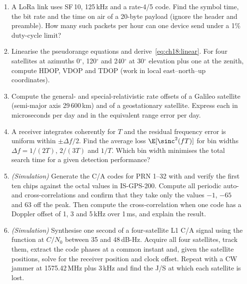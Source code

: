 \begin{enumerate}[label=\thechapter.\arabic*]
Cauchy--Schwarz) and derive~\eqref{eq:ch18:mrc}. For two paths of mean SNR 10\,dB each, compute
the probability that the combined SNR falls below 3\,dB, and compare with a single path of mean
SNR 13\,dB.
\item A LoRa link uses SF\,10, 125\,kHz and a rate-4/5 code. Find the symbol time, the bit rate
and the time on air of a 20-byte payload (ignore the header and preamble). How many such
packets per hour can one device send under a 1\% duty-cycle limit?
\item Linearise the pseudorange equations and derive~\eqref{eq:ch18:linear}. For four satellites
at azimuths 0$^\circ$, 120$^\circ$ and 240$^\circ$ at 30$^\circ$ elevation plus one at the
zenith, compute HDOP, VDOP and TDOP (work in local east--north--up coordinates).
\item Compute the general- and special-relativistic rate offsets of a Galileo satellite
(semi-major axis 29\,600\,km) and of a geostationary satellite. Express each in microseconds per
day and in the equivalent range error per day.
\item A receiver integrates coherently for $T$ and the residual frequency error is uniform within
$\pm\Delta f/2$. Find the average loss $\E[\sinc^2(fT)]$ for bin widths $\Delta f=1/(2T)$, $2/(3T)$
and $1/T$. Which bin width minimises the total search time for a given detection performance?
\item \emph{(Simulation)} Generate the C/A codes for PRN 1--32 with
 and verify the first ten chips against the octal values in
IS-GPS-200. Compute all periodic auto- and cross-correlations and confirm that they take only the
values $-1$, $-65$ and $63$ off the peak. Then compute the cross-correlation when one code has a
Doppler offset of 1, 3 and 5\,kHz over 1\,ms, and explain the result.
\item \emph{(Simulation)} Synthesise one second of a four-satellite L1 C/A signal using the
function  at $C/N_0$ between 35 and 48\,dB-Hz. Acquire all four satellites,
track them, extract the code phases at a common instant and, given the satellite positions,
solve for the receiver position and clock offset. Repeat with a CW jammer at 1575.42\,MHz plus
3\,kHz and find the J/S at which each satellite is lost.
\end{enumerate}

